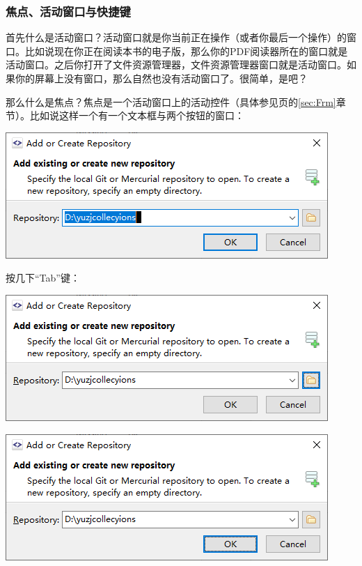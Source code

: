\subsubsection{焦点、活动窗口与快捷键}
首先什么是活动窗口？活动窗口就是你当前正在操作（或者你最后一个操作）的窗口。比如说现在你正在阅读本书的电子版，那么你的PDF阅读器所在的窗口就是活动窗口。之后你打开了文件资源管理器，文件资源管理器窗口就是活动窗口。如果你的屏幕上没有窗口，那么自然也没有活动窗口了。很简单，是吧？\par
那么什么是焦点？焦点是一个活动窗口上的活动控件（具体参见\pageref{sec:Frm}页的\ref{sec:Frm}章节）。比如说这样一个有一个文本框与两个按钮的窗口：\par
\begin{center}
	\includegraphics{pic/forcus1}
\end{center} \par
按几下“Tab”键：\par
\begin{center}
	\includegraphics{pic/forcus2}
\end{center} \par
\begin{center}
	\includegraphics{pic/forcus3}
\end{center} \par
